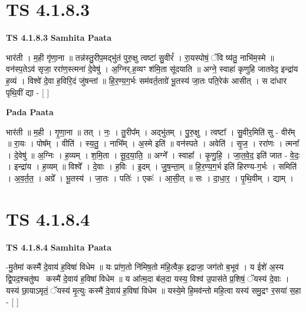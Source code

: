 \documentclass[17pt]{extarticle}
\begin{document}

\section{ TS 4.1.8.3 }

\textbf{TS 4.1.8.3 } \newline
\textbf{Samhita Paata} \newline

भार॑ती । म॒ही गृ॑णा॒ना ॥ तन्न॑स्तु॒रीप॒मद्भु॑तं पुरु॒क्षु त्वष्टा॑ सु॒वीरं᳚ । रा॒यस्पोषं॒ ॅवि ष्य॑तु॒ नाभि॑म॒स्मे ॥ वन॑स्प॒तेऽव॑ सृजा॒ ररा॑ण॒स्त्मना॑ दे॒वेषु॑ । अ॒ग्निर्.ह॒व्यꣳ श॑मि॒ता सू॑दयाति ॥ अग्ने॒ स्वाहा॑ कृणुहि जातवेद॒ इन्द्रा॑य ह॒व्यं । विश्वे॑ दे॒वा ह॒विरि॒दं जु॑षन्तां ॥ हि॒र॒ण्य॒ग॒र्भः सम॑वर्त॒ताग्रे॑ भू॒तस्य॑ जा॒तः पति॒रेक॑ आसीत् । स दा॑धार पृथि॒वीं द्या - [  ] \newline

\textbf{Pada Paata} \newline

भार॑ती ॥ म॒ही । गृ॒णा॒ना ॥ तत् । नः॒ । तु॒रीप᳚म् । अद्भु॑तम् । पु॒रु॒क्षु । त्वष्टा᳚ । सु॒वीर॒मिति॑ सु - वीर᳚म् ॥ रा॒यः । पोष᳚म् । वीति॑ । स्य॒तु॒ । नाभि᳚म् । अ॒स्मे इति॑ ॥ वन॑स्पते । अवेति॑ । सृ॒ज॒ । ररा॑णः । त्मना᳚ । दे॒वेषु॑ ॥ अ॒ग्निः । ह॒व्यम् । श॒मि॒ता । सू॒द॒या॒ति॒ ॥ अग्ने᳚ । स्वाहा᳚ । कृ॒णु॒हि॒ । जा॒त॒वे॒द॒ इति॑ जात - वे॒दः॒ । इन्द्रा॑य । ह॒व्यम् ॥ विश्वे᳚ । दे॒वाः । ह॒विः । इ॒दम् । जु॒ष॒न्ता॒म् ॥ हि॒र॒ण्य॒ग॒र्भ इति॑ हिरण्य-ग॒र्भः । समिति॑ । अ॒व॒र्त॒त॒ । अग्रे᳚ । भू॒तस्य॑ । जा॒तः । पतिः॑ । एकः॑ । आ॒सी॒त् ॥ सः । दा॒धा॒र॒ । पृ॒थि॒वीम् । द्याम् ।  \newline





\section{ TS 4.1.8.4 }

\textbf{TS 4.1.8.4 } \newline
\textbf{Samhita Paata} \newline

-मु॒तेमां कस्मै॑ दे॒वाय॑ ह॒विषा॑ विधेम ॥ यः प्रा॑ण॒तो नि॑मिष॒तो म॑हि॒त्वैक॒ इद्राजा॒ जग॑तो ब॒भूव॑ । य ईशे॑ अ॒स्य द्वि॒पद॒श्चतु॑ष्पदः᳡कस्मै॑ दे॒वाय॑ ह॒विषा॑ विधेम ॥ य आ᳚त्म॒दा ब॑ल॒दा यस्य॒ विश्व॑ उ॒पास॑ते प्र॒शिषं॒ ॅयस्य॑ दे॒वाः । यस्य॑ छा॒याऽमृतं॒ ॅयस्य॑ मृ॒त्युः कस्मै॑ दे॒वाय॑ ह॒विषा॑ विधेम ॥ यस्ये॒मे हि॒मव॑न्तो महि॒त्वा यस्य॑ समु॒द्रꣳ र॒सया॑ स॒हा - [  ] \newline
\end{document}
